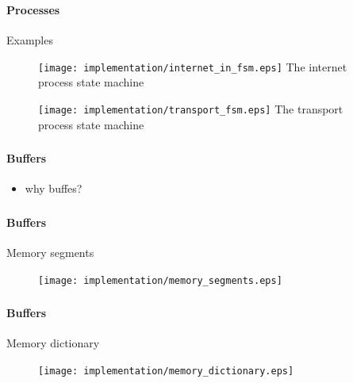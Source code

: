 \begin{frame}[fragile]
    \frametitle{\ImplementationTitle}
    \framesubtitle{Processes}
    Examples\\
    \begin{minipage}[t]{0.5\textwidth}
        \begin{figure}
            \centering
            \texttt{[image: implementation/internet\_in\_fsm.eps]}
            The internet process state machine
        \end{figure}
    \end{minipage}%
    \hfill%
    \begin{minipage}[t]{0.5\textwidth}
        \begin{figure}
            \centering
            \texttt{[image: implementation/transport\_fsm.eps]}
            The transport process state machine
        \end{figure}
    \end{minipage}
\end{frame}

\begin{frame}[fragile]
    \frametitle{\ImplementationTitle}
    \framesubtitle{Buffers}
    \begin{itemize}
        \item why buffes?
    \end{itemize}
\end{frame}


\begin{frame}[fragile]
    \frametitle{\ImplementationTitle}
    \framesubtitle{Buffers}
    Memory segments\\
    \begin{minipage}[t]{1\textwidth}
        \begin{figure}
                \centering
                \texttt{[image: implementation/memory\_segments.eps]}
        \end{figure}
    \end{minipage}
\end{frame}

\begin{frame}[fragile]
    \frametitle{\ImplementationTitle}
    \framesubtitle{Buffers}
    Memory dictionary\\
    \begin{minipage}[t]{1\textwidth}
        \begin{figure}
                \centering
                \texttt{[image: implementation/memory\_dictionary.eps]}
        \end{figure}
    \end{minipage}
\end{frame}

